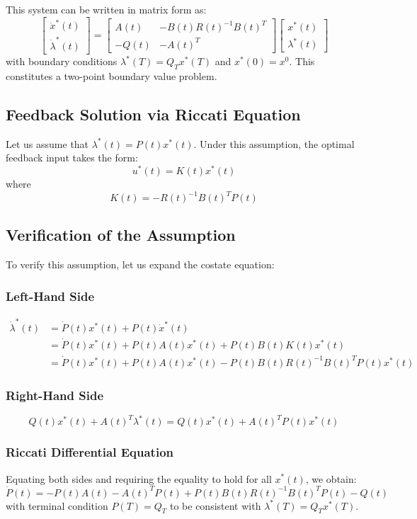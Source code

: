 \documentclass[openany]{book}
\theoremstyle{definition}
\theoremstyle{remark}
\begin{document}
This system can be written in matrix form as:
\[
    \begin{bmatrix}
        \dot{x}^*(t) \\ \dot{\lambda}^*(t)
    \end{bmatrix} = 
    \begin{bmatrix}
        A(t) & -B(t)R(t)^{-1}B(t)^T \\
        -Q(t) & -A(t)^T
    \end{bmatrix}
    \begin{bmatrix}
        x^*(t) \\ \lambda^*(t)
    \end{bmatrix}
\]
with boundary conditions $\lambda^*(T) = Q_Tx^*(T)$ and $x^*(0) = x^0$. This constitutes a two-point boundary value problem.

\subsection{Feedback Solution via Riccati Equation}
Let us assume that $\lambda^*(t) = P(t)x^*(t)$. Under this assumption, the optimal feedback input takes the form:
\[
    u^*(t) = K(t)x^*(t)
\]
where
\[
    K(t) = -R(t)^{-1}B(t)^TP(t)
\]

\subsection{Verification of the Assumption}
To verify this assumption, let us expand the costate equation:

\subsubsection{Left-Hand Side}
\begin{align*}
    \dot{\lambda}^*(t) &= \dot{P}(t)x^*(t) + P(t)\dot{x}^*(t)\\
    &= \dot{P}(t)x^*(t) + P(t)A(t)x^*(t) + P(t)B(t)K(t)x^*(t)\\
    &= \dot{P}(t)x^*(t) + P(t)A(t)x^*(t) - P(t)B(t)R(t)^{-1}B(t)^TP(t)x^*(t)
\end{align*}

\subsubsection{Right-Hand Side}
\[
    Q(t)x^*(t) + A(t)^T\lambda^*(t) = Q(t)x^*(t) + A(t)^TP(t)x^*(t)
\]

\subsubsection{Riccati Differential Equation}
Equating both sides and requiring the equality to hold for all $x^*(t)$, we obtain:
\[
    \dot{P}(t) = -P(t)A(t) - A(t)^TP(t) + P(t)B(t)R(t)^{-1}B(t)^TP(t) - Q(t)
\]
with terminal condition $P(T) = Q_T$ to be consistent with $\lambda^*(T) = Q_Tx^*(T)$.
\end{document}
